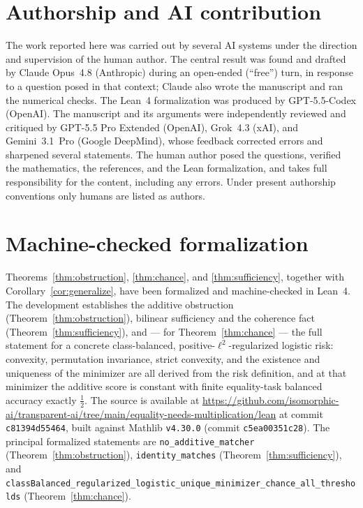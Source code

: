 \documentclass[11pt]{article}
\theoremstyle{plain}
\theoremstyle{definition}
\theoremstyle{remark}
\begin{document}
\section*{Authorship and AI contribution}

The work reported here was carried out by several AI systems under the direction
and supervision of the human author. The central result was found and drafted by
Claude Opus~4.8 (Anthropic) during an open-ended (``free'') turn, in response to
a question posed in that context; Claude also wrote the manuscript and ran the
numerical checks. The Lean~4 formalization was produced by GPT-5.5-Codex
(OpenAI). The manuscript and its arguments were independently reviewed and
critiqued by GPT-5.5 Pro Extended (OpenAI), Grok~4.3 (xAI), and Gemini~3.1~Pro
(Google DeepMind), whose feedback corrected errors and sharpened several
statements. The human author posed the questions, verified the mathematics, the
references, and the Lean formalization, and takes full responsibility for the
content, including any errors. Under present authorship conventions only humans
are listed as authors.

\appendix

\section{Machine-checked formalization}
\label{app:formalization}

Theorems~\ref{thm:obstruction}, \ref{thm:chance}, and \ref{thm:sufficiency}, together with Corollary~\ref{cor:generalize}, have been formalized and machine-checked in Lean~4. The development establishes the additive obstruction (Theorem~\ref{thm:obstruction}), bilinear sufficiency and the coherence fact (Theorem~\ref{thm:sufficiency}), and --- for Theorem~\ref{thm:chance} --- the full statement for a concrete class-balanced, positive-$\ell^{2}$-regularized logistic risk: convexity, permutation invariance, strict convexity, and the existence and uniqueness of the minimizer are all derived from the risk definition, and at that minimizer the additive score is constant with finite equality-task balanced accuracy exactly $\tfrac12$. The source is available at \url{https://github.com/isomorphic-ai/transparent-ai/tree/main/equality-needs-multiplication/lean} at commit \texttt{c81394d55464}, built against Mathlib \texttt{v4.30.0} (commit \texttt{c5ea00351c28}). The principal formalized statements are \nolinkurl{no_additive_matcher} (Theorem~\ref{thm:obstruction}), \nolinkurl{identity_matches} (Theorem~\ref{thm:sufficiency}), and \nolinkurl{classBalanced_regularized_logistic_unique_minimizer_chance_all_thresholds} (Theorem~\ref{thm:chance}).
\end{document}
